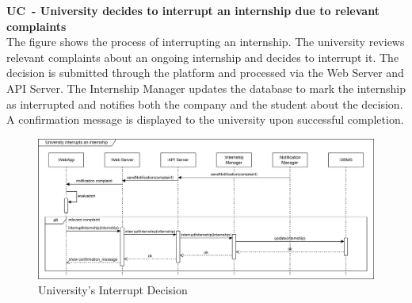 \textbf{UC\cuc\  - University decides to interrupt an internship due to relevant complaints} \\
The figure shows the process of interrupting an internship. The university reviews relevant complaints about an ongoing internship and decides to interrupt it. The decision is submitted through the platform and processed via the Web Server and API Server. The Internship Manager updates the database to mark the internship as interrupted and notifies both the company and the student about the decision. A confirmation message is displayed to the university upon successful completion.
\begin{center}
    \begin{figure}[H]
        \centering
        \includegraphics[width=1\linewidth]{Images/Sequence diagrams/UC16.png}
        \caption{University's Interrupt Decision}
        \label{fig:enter-label}
    \end{figure}
\end{center}


